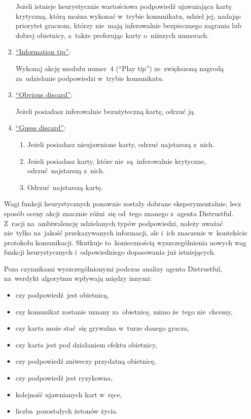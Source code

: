 \documentclass[declaration,shortabstract,inz]{iithesis}
\begin{document}
\begin{enumerate}
	Jeżeli istnieje heurystycznie wartościowa podpowiedź ujawniająca kartę krytyczną, którą można wykonać w~trybie komunikatu, udziel jej, nadając priorytet graczom, którzy nie~mają inferowalnie bezpiecznego zagrania lub dobrej obietnicy, a~także preferując karty o~niższych numerach.
	
	\item \underline{``Information tip''}:
	
	Wykonaj akcję modułu numer~4 (``Play tip'') ze~zwiększoną nagrodą za~udzielanie podpowiedzi w~trybie komunikatu.
	
	\item \underline{``Obvious discard''}:
	
	Jeżeli posiadasz inferowalnie bezużyteczną kartę, odrzuć ją.

	\item \underline{``Guess discard''}:
	\begin{enumerate}
		\item Jeżeli posiadasz nieujawnione karty, odrzuć najstarszą z~nich.
		\item Jeżeli posiadasz karty, które nie~są~inferowalnie krytyczne, odrzuć najstarszą z~nich.
		\item Odrzuć najstarszą kartę.
	\end{enumerate}

\end{enumerate}

Wagi funkcji heurystycznych ponownie zostały dobrane eksperymentalnie, lecz sposób oceny akcji znacznie różni~się od~tego znanego z~agenta Distrustful. Z~racji na~ambiwalencję udzielanych typów podpowiedzi, należy uważać nie~tylko na~jakość przekazywanych informacji, ale i~ich znaczenie w~kontekście protokołu komunikacji. Skutkuje to~koniecznością wyszczególnienia nowych wag funkcji heurystycznych i~odpowiedniego dopasowania już istniejących.

Poza czynnikami wyszczególnionymi podczas analizy agenta Distrustful, na~werdykt algorytmu wpływają między innymi:

\begin{itemize}
	\item czy podpowiedź jest obietnicą,
	\item czy komunikat zostanie uznany za~obietnicę, mimo że~tego nie~chcemy,
	\item czy karta może stać~się grywalna w~turze danego gracza,
	\item czy karta jest pod działaniem efektu obietnicy,
	\item czy podpowiedź zniweczy przydatną obietnicę,
	\item czy podpowiedź jest ryzykowna,
	\item kolejność ujawnianych kart w~ręce,
	\item liczba pozostałych żetonów życia.
\end{itemize}
\end{document}
